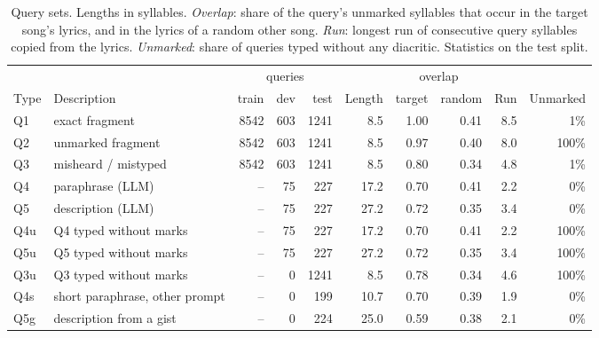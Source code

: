 \begin{table}[t]
\centering
\caption{Query sets. Lengths in syllables. \emph{Overlap}: share of the query's unmarked syllables that occur in
the target song's lyrics, and in the lyrics of a random other song. \emph{Run}: longest run of consecutive query
syllables copied from the lyrics. \emph{Unmarked}: share of queries typed without any diacritic. Statistics on the
test split.}
\label{tab:queries}
\footnotesize
\setlength{\tabcolsep}{4.5pt}
\begin{tabular}{@{}llrrrrrrrr@{}}
\toprule
 & & \multicolumn{3}{c}{queries} & & \multicolumn{2}{c}{overlap} & & \\
\cmidrule(lr){3-5} \cmidrule(lr){7-8}
Type & Description & train & dev & test & Length & target & random & Run & Unmarked \\
\midrule
Q1 & exact fragment & 8542 & 603 & 1241 & 8.5 & 1.00 & 0.41 & 8.5 & 1\% \\
Q2 & unmarked fragment & 8542 & 603 & 1241 & 8.5 & 0.97 & 0.40 & 8.0 & 100\% \\
Q3 & misheard / mistyped & 8542 & 603 & 1241 & 8.5 & 0.80 & 0.34 & 4.8 & 1\% \\
Q4 & paraphrase (LLM) & -- & 75 & 227 & 17.2 & 0.70 & 0.41 & 2.2 & 0\% \\
Q5 & description (LLM) & -- & 75 & 227 & 27.2 & 0.72 & 0.35 & 3.4 & 0\% \\
Q4u & Q4 typed without marks & -- & 75 & 227 & 17.2 & 0.70 & 0.41 & 2.2 & 100\% \\
Q5u & Q5 typed without marks & -- & 75 & 227 & 27.2 & 0.72 & 0.35 & 3.4 & 100\% \\
Q3u & Q3 typed without marks & -- & 0 & 1241 & 8.5 & 0.78 & 0.34 & 4.6 & 100\% \\
Q4s & short paraphrase, other prompt & -- & 0 & 199 & 10.7 & 0.70 & 0.39 & 1.9 & 0\% \\
Q5g & description from a gist & -- & 0 & 224 & 25.0 & 0.59 & 0.38 & 2.1 & 0\% \\
\bottomrule
\end{tabular}
\end{table}
